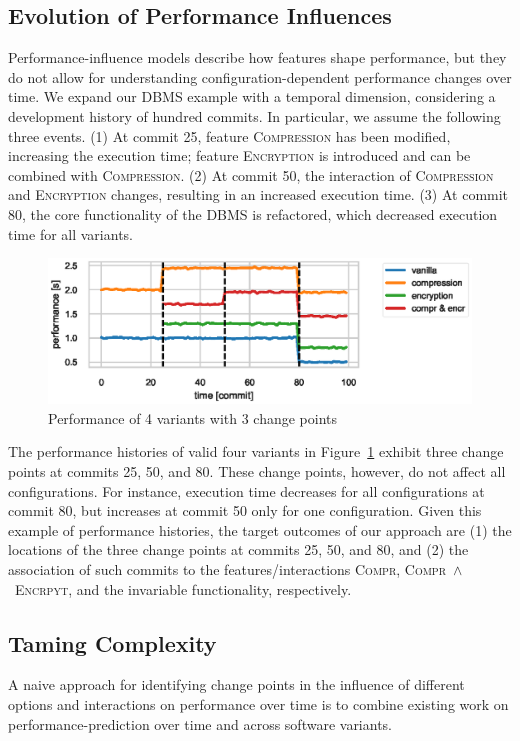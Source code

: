 \documentclass[sigconf]{acmart}
\begin{document}
	\subsection{Evolution of Performance Influences}
	Performance-influence models describe how features shape performance, but they do not allow for understanding configuration-dependent performance changes over time.
	We expand our DBMS example with a temporal dimension, considering a development history of hundred commits.
	In particular, we assume the following three events. (1) At commit 25, feature \textsc{Compression} has been modified, increasing the execution time; feature \textsc{Encryption} is introduced and can be combined with \textsc{Compression}. (2) At commit 50, the interaction of \textsc{Compression} and \textsc{Encryption} changes, resulting in an increased execution time. (3) At commit 80, the core functionality of the DBMS is refactored, which decreased execution time for all variants.
	\begin{figure}[ht!]
			\centering
			\includegraphics[width=\linewidth]{images/dbms_performance.eps}
			\caption{Performance of 4 variants with 3 change points}
			\label{fig:dbms_performance}
	\end{figure}

	The performance histories of valid four variants in Figure~\ref{fig:dbms_performance} exhibit three change points at commits 25, 50, and 80. These change points, however, do not affect all configurations.
	For  instance, execution time decreases for all configurations at commit 80, but increases at commit 50 only for one configuration.
	Given this example of performance histories, the target outcomes of our approach are (1) the locations of the three change points at commits 25, 50, and 80, and (2) the association of such commits to the features/interactions \textsc{Compr}, \textsc{Compr\ $\land$\ Encrpyt}, and the invariable functionality, respectively.

	\subsection{Taming Complexity}
	A naive approach for identifying change points in the influence of different options and interactions on performance over time is to combine existing work on performance-prediction over time and across software variants.
\end{document}
